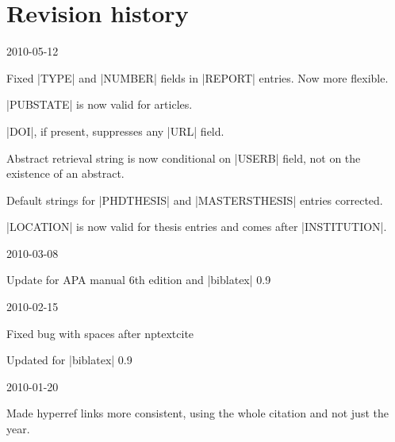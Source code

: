 \documentclass{ltxdockit}
\begin{document}
\section{Revision history}

\begin{changelog}

\begin{release}{1.0}{2010-05-12}
\item Fixed |TYPE| and |NUMBER| fields in |REPORT| entries. Now more
  flexible.
\item |PUBSTATE| is now valid for articles.
\item |DOI|, if present, suppresses any |URL| field.
\item Abstract retrieval string is now conditional on |USERB| field, not on
  the existence of an abstract.
\item Default strings for |PHDTHESIS| and |MASTERSTHESIS| entries corrected.
\item |LOCATION| is now valid for thesis entries and comes after |INSTITUTION|.
\end{release}

\begin{release}{0.9}{2010-03-08}
\item Update for APA manual 6th edition and |biblatex| 0.9
\end{release}

\begin{release}{0.8}{2010-02-15}
\item Fixed bug with spaces after nptextcite
\item Updated for |biblatex| 0.9
\end{release}

\begin{release}{0.7}{2010-01-20}
\item Made hyperref links more consistent, using the whole citation and not
  just the year.
\end{release}



\end{changelog}
\end{document}
